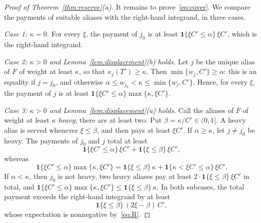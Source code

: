 \documentclass[format=acmsmall, review=false]{acmart}
\begin{document}
\begin{proof}[Proof of Theorem~\ref{thm:reserve}(a)]
It remains to prove~\eqref{eq:cover}. We compare the payments of
suitable aliases with the right-hand integrand, in three cases.

\emph{Case 1: \(\kappa=0\).} For every \(\xi\), the payment of
\(j_0\) is at least
\(\mathbf{1}\{\xi C'\le\alpha\}\,\xi C'\), which is the
right-hand integrand.

\emph{Case 2: \(\kappa>0\) and
Lemma~\ref{lem:displacement}(b) holds.} Let \(j\) be the unique
alias of \(F\) of weight at least \(\kappa\), so that
\(\kappa_j(T')\ge\kappa\). Then \(\min\{w_j,C'\}\ge\alpha\): this
is an equality if \(j=j_0\), and otherwise
\(\alpha\le w_{j_0}<\kappa\le\min\{w_j,C'\}\). Hence, for every
\(\xi\), the payment of \(j\) is at least
\(\mathbf{1}\{\xi C'\le\alpha\}\max\{\kappa,\xi C'\}\).

\emph{Case 3: \(\kappa>0\) and
Lemma~\ref{lem:displacement}(a) holds.} Call the aliases of
\(F\) of weight at least \(\kappa\) \emph{heavy}; there are at
least two. Put \(\beta=\kappa/C'\in(0,1]\). A heavy alias is
served whenever \(\xi\le\beta\), and then pays at least
\(\xi C'\). If \(\alpha\ge\kappa\), let \(j\ne j_0\) be heavy.
The payments of \(j_0\) and \(j\) total at least
\[
\mathbf{1}\{\xi C'\le\alpha\}\,\xi C'
+\mathbf{1}\{\xi\le\beta\}\,\xi C',
\]
whereas
\[
\mathbf{1}\{\xi C'\le\alpha\}\max\{\kappa,\xi C'\}
=\mathbf{1}\{\xi\le\beta\}\,\kappa
+\mathbf{1}\{\kappa<\xi C'\le\alpha\}\,\xi C'.
\]
If \(\alpha<\kappa\), then \(j_0\) is not heavy, two heavy
aliases pay at least
\(2\cdot\mathbf{1}\{\xi\le\beta\}\,\xi C'\) in total, and
\(\mathbf{1}\{\xi C'\le\alpha\}\max\{\kappa,\xi C'\}
\le\mathbf{1}\{\xi\le\beta\}\,\kappa\). In both subcases, the
total payment exceeds the right-hand integrand by at least
\[
\mathbf{1}\{\xi\le\beta\}\,(2\xi-\beta)\,C',
\]
whose expectation is nonnegative by~\eqref{eq:R}.
\end{proof}
\end{document}
